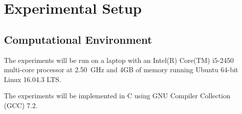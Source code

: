 %
%
%
%   
%
%
\chapter{Experimental Setup} \label{chap:experimentalsetup}
\vspace{-1cm}

\section{Computational Environment}

The experiments will be run on a laptop with an Intel(R) Core(TM) i5-2450 multi-core processor at 2.50~GHz and 4GB of memory running Ubuntu 64-bit Linux 16.04.3 LTS.

The experiments will be implemented in C using GNU Compiler Collection (GCC) 7.2.




